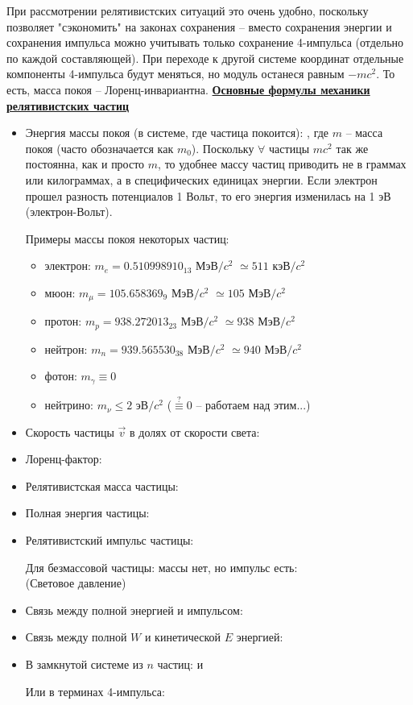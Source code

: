 \documentclass[12pt,epsfig,color,russian]{article}
\begin{document}
При рассмотрении релятивистских ситуаций это очень удобно, поскольку позволяет "сэкономить" на законах сохранения -- вместо сохранения энер\-гии и сохранения импульса можно учитывать только сохранение 4-импуль\-са (отдельно по каждой составляющей). При переходе к другой системе координат отдельные компоненты 4-импульса будут меняться, но модуль останеся равным $-mc^2$. То есть, масса покоя -- Лоренц-инвариантна.
\newpage
\underline{\bf Основные формулы механики релятивистских частиц}
\begin{itemize}
 \item Энергия массы покоя (в системе, где частица покоится): , где $m$ -- масса покоя (часто обозначается как $m_0$). Поскольку $\forall$ частицы $mc^2$ так же постоянна, как и просто $m$, то удобнее массу частиц приводить не в граммах или килограммах, а в специфических единицах энергии. Если электрон прошел разность потенциалов 1 Вольт, то его энергия изменилась на 1 эВ (электрон-Вольт).
     
     Примеры массы покоя некоторых частиц: \begin{itemize}
     \item электрон: $m_e=0.510998910_{13}$ МэВ$/c^2$ $\simeq511$ кэВ$/c^2$
     \item мюон: $m_\mu=105.658369_{9}$ МэВ$/c^2$ $\simeq105$ МэВ$/c^2$
     \item протон:  $m_p=938.272013_{23}$ МэВ$/c^2$ $\simeq938$ МэВ$/c^2$
     \item нейтрон: $m_n=939.565530_{38}$ МэВ$/c^2$ $\simeq940$ МэВ$/c^2$
     \item фотон: $m_\gamma\equiv0$
     \item нейтрино: $m_\nu\leq 2$ эВ$/c^2$ ($\stackrel{?}{\equiv}0$  -- работаем над этим...)
     \end{itemize}
 \item Скорость частицы $\vec{v}$ в долях от скорости света:      
 \item Лоренц-фактор: 
 \item Релятивистская масса частицы: 
 \item Полная энергия частицы: 
 \item Релятивистский импульс частицы: 
     
     Для безмассовой частицы: массы нет, но импульс есть: \\ (Световое давление)
 \item Связь между полной энергией и импульсом: 
 \item Связь между полной $W$ и кинетической $E$ энергией: 
 \item В замкнутой системе из $n$ частиц:  и 
     
     Или в терминах 4-импульса:
\end{itemize}
\end{document}
